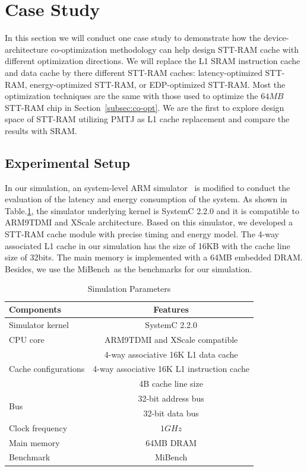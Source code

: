 \section{Case Study} \label{sec:case}

In this section we will conduct one case study to demonstrate how the device-architecture co-optimization methodology can help design STT-RAM cache with different optimization directions. We will replace the L1 SRAM instruction cache and data cache by there different STT-RAM caches: latency-optimized STT-RAM, energy-optimized STT-RAM, or EDP-optimized STT-RAM. Most the optimization techniques are the same with those used to optimize the $64MB$ STT-RAM chip in Section~\ref{subsec:co-opt}. We are the first to explore design space of STT-RAM utilizing PMTJ as L1 cache replacement and compare the results with SRAM.

\subsection{Experimental Setup}
In our simulation, an system-level ARM simulator~\cite{FaCSim} is modified to conduct the evaluation of the latency and energy consumption of the system. As shown in Table.\ref{tb:parameters}, the simulator underlying kernel is SystemC 2.2.0 and it is compatible to ARM9TDMI and XScale architecture. Based on this simulator, we developed a STT-RAM cache module with precise timing and energy model. The 4-way associated  L1 cache in our simulation has the size of 16KB with the cache line size of 32bits. The main memory is implemented with a 64MB embedded DRAM. Besides, we use the MiBench~\cite{MiBench}as the benchmarks for our simulation.

\begin{table}[t]
\centering
\caption{Simulation Parameters}
\label{tb:parameters}
\vspace{-5pt}
\begin{tabular}{ l | c }
\hline \hline
Components & Features\\
\hline
Simulator kernel & SystemC 2.2.0\\
\hline
CPU core & ARM9TDMI and XScale compatible \\
\hline
\multirow{3}{*}{Cache configurations} & 4-way associative 16K L1 data cache \\
& 4-way associative 16K L1 instruction cache \\
& 4B cache line size \\
\hline
\multirow{2}{*}{Bus} & 32-bit address bus  \\
& 32-bit data bus \\
\hline
Clock frequency & $1GHz$ \\
\hline
Main memory & 64MB DRAM \\
\hline
Benchmark & MiBench \\
\hline\hline
\end{tabular}
\vspace{-10pt}
\end{table}

